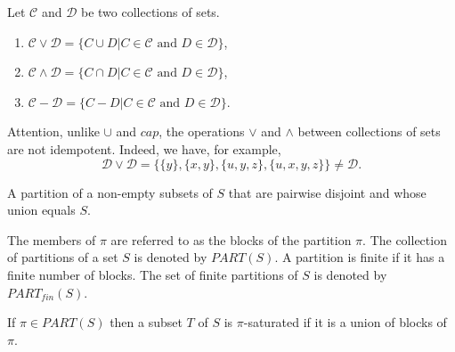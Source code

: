 \documentclass[../main.tex]{subfiles}
\begin{document}
\begin{purple}
\begin{definition}

Let $\mathcal{C}$ and $\mathcal{D}$ be two collections of sets.

\begin{enumerate}
    \item $\mathcal{C} \lor \mathcal{D}=\{C\cup D| C \in \mathcal{C}\text{ and } D \in \mathcal{D}\}$,
    \item $\mathcal{C} \land \mathcal{D}=\{C\cap D| C \in \mathcal{C}\text{ and } D \in \mathcal{D}\}$,
    \item $\mathcal{C} - \mathcal{D}=\{C - D| C \in \mathcal{C}\text{ and } D \in \mathcal{D}\}$.
\end{enumerate}
\end{definition}
\end{purple}

Attention, unlike $\cup$ and $cap$, the operations $\lor$ and $\land$ between collections of sets are not idempotent. Indeed, we have, for example, 
$$
\mathcal{D}\lor\mathcal{D}=\{\{y\},\{x,y\},\{u, y, z\},\{u,x,y,z\}\}\neq\mathcal{D}.
$$

\begin{purple}
\begin{definition}
A partition of a non-empty subsets of $S$ that are pairwise disjoint and whose union equals $S$. 

The members of $\pi$ are referred to as the blocks of the partition $\pi$. The collection of partitions of a set $S$ is denoted by $PART(S)$. A partition is finite if it has a finite number of blocks. The set of finite partitions of $S$ is denoted by $PART_{fin}(S)$.

If $\pi\in PART(S)$ then a subset $T$ of $S$ is $\pi$-saturated if it is a union of blocks of $\pi$.
\end{definition}
\end{purple}
\end{document}
